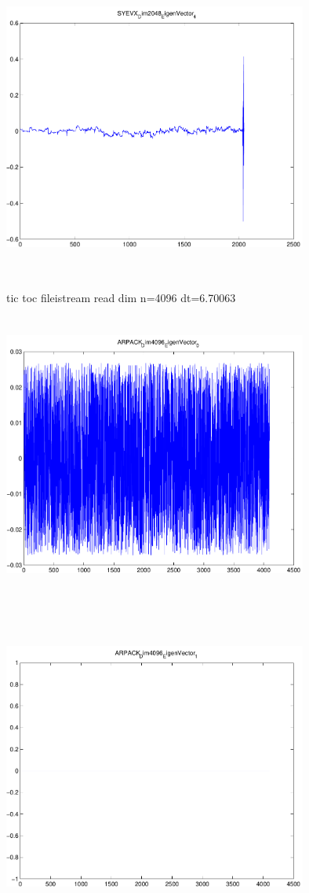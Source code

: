 \documentclass[9pt]{article}
\theoremstyle{plain}
\theoremstyle{definition}
\theoremstyle{remark}
\numberwithin{equation}{section}
\begin{document}
\includegraphics[width=10.0cm,height=10.0cm]{SYEVX_Dim2048_EigenVector_4.pdf}

tic toc fileistream read dim n=4096 dt=6.70063
\includegraphics[width=10.0cm,height=10.0cm]{ARPACK_Dim4096_EigenVector_0.pdf}

\includegraphics[width=10.0cm,height=10.0cm]{ARPACK_Dim4096_EigenVector_1.pdf}
\end{document}
